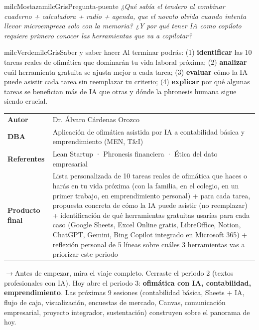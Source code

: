 \documentclass[11pt,letterpaper]{article}
\newcommand{\puente}[1]{%
  \begin{puentebox}%
    \textcolor{milcGradeDark}{$\rightarrow$}\hspace{2mm}#1%
  \end{puentebox}%
}
\begin{document}
\begin{softbox}{milcMostaza}{milcGris}{Pregunta-puente}
\textit{¿Qué sabía el tendero al combinar cuaderno + calculadora + radio + agenda, que el novato olvida cuando intenta llevar microempresa solo con la memoria? ¿Y por qué tener IA como copiloto requiere primero conocer las herramientas que va a copilotar?}
\end{softbox}

\begin{softbox}{milcVerde}{milcGris}{Saber y saber hacer}
Al terminar podrás: (1) \textbf{identificar} las 10 tareas reales de ofimática que dominarán tu vida laboral próxima; (2) \textbf{analizar} cuál herramienta gratuita se ajusta mejor a cada tarea; (3) \textbf{evaluar} cómo la IA puede asistir cada tarea sin reemplazar tu criterio; (4) \textbf{explicar} por qué algunas tareas se benefician más de IA que otras y dónde la phronesis humana sigue siendo crucial.
\end{softbox}



\small
\begin{tabularx}{\textwidth}{>{\bfseries}p{3.0cm}Y}
Autor & Dr. Álvaro Cárdenas Orozco\\
DBA & Aplicación de ofimática asistida por IA a contabilidad básica y emprendimiento (MEN, T\&I)\\
Referentes & Lean Startup · Phronesis financiera · Ética del dato empresarial\\
Producto final & Lista personalizada de 10 tareas reales de ofimática que haces o harás en tu vida próxima (con la familia, en el colegio, en un primer trabajo, en emprendimiento personal) + para cada tarea, propuesta concreta de cómo la IA puede asistir (no reemplazar) + identificación de qué herramientas gratuitas usarías para cada caso (Google Sheets, Excel Online gratis, LibreOffice, Notion, ChatGPT, Gemini, Bing Copilot integrado en Microsoft 365) + reflexión personal de 5 líneas sobre cuáles 3 herramientas vas a priorizar este periodo\\
\end{tabularx}
\normalsize

\puente{Antes de empezar, mira el viaje completo. Cerraste el periodo 2 (textos profesionales con IA). Hoy abre el periodo 3: \textbf{ofimática con IA, contabilidad, emprendimiento}. Las próximas 9 sesiones (contabilidad básica, Sheets + IA, flujo de caja, visualización, encuestas de mercado, Canvas, comunicación empresarial, proyecto integrador, sustentación) construyen sobre el panorama de hoy.}
\end{document}

